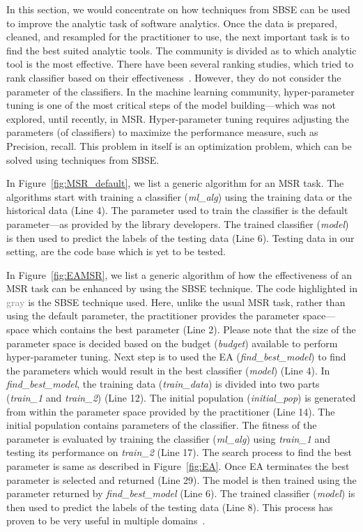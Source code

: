 \documentclass[table, xcdraw, sigconf,review, anonymous]{acmart}
\begin{document}
In this section, we would concentrate on how techniques from SBSE can be used to improve the analytic task of software analytics. Once the data is prepared, cleaned, and resampled for the practitioner to use, the next important task is to find the best suited analytic tools. The community is divided as to which analytic tool is the most effective. There have been several ranking studies, which tried to rank classifier based on their effectiveness~\cite{lessmann2008benchmarking,hall2012systematic,elish2008predicting,menzies2010defect,gondra2008applying}. However, they do not consider the parameter of the classifiers. In the machine learning community, hyper-parameter tuning is one of the most critical steps of the model building---which was not explored, until recently, in MSR. Hyper-parameter tuning requires adjusting the parameters (of classifiers) to maximize the performance measure, such as Precision, recall. This problem in itself is an optimization problem, which can be solved using techniques from SBSE. 

In Figure~\ref{fig:MSR_default}, we list a generic algorithm for an MSR task. The algorithms start with training a classifier (\textit{ml\_alg}) using the training data or the historical data (Line 4). The parameter used to train the classifier is the default parameter---as provided by the library developers. The trained classifier (\textit{model}) is then used to predict the labels of the testing data (Line 6). Testing data in our setting, are the code base which is yet to be tested. 

In Figure~\ref{fig:EAMSR}, we list a generic algorithm of how the effectiveness of an MSR task can be enhanced by using the SBSE technique. The code highlighted in \textcolor{gray}{gray} is the SBSE technique used. Here, unlike the usual MSR task, rather than using the default parameter, the practitioner provides the parameter space---space which contains the best parameter (Line 2). Please note that the size of the parameter space is decided based on the budget (\textit{budget}) available to perform hyper-parameter tuning. Next step is to used the EA (\textit{find\_best\_model}) to find the parameters which would result in the best classifier (\textit{model}) (Line 4). In \textit{find\_best\_model}, the training data (\textit{train\_data}) is divided into two parts (\textit{train\_1} and \textit{train\_2}) (Line 12). The initial population (\textit{initial\_pop}) is generated from within the parameter space provided by the practitioner (Line 14). The initial population contains parameters of the classifier. The fitness of the parameter is evaluated by training  the classifier (\textit{ml\_alg}) using \textit{train\_1} and testing its performance on \textit{train\_2} (Line 17). The search process to find the best parameter is same as described in Figure~\ref{fig:EA}. Once EA terminates the best parameter is selected and returned (Line 29). The model is then trained using the parameter returned by \textit{find\_best\_model} (Line 6). The trained classifier (\textit{model}) is then used to predict the labels of the testing data (Line 8). This process has proven to be very useful in multiple domains~\cite{fu2016tuning, fu2016differential, fu2017easy, agrawal2017better, tantithamthavorn2016automated}.
\end{document}
